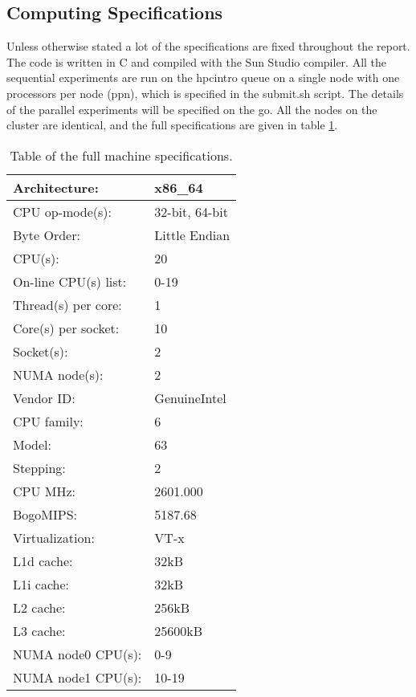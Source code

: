 \subsection{Computing Specifications}
Unless otherwise stated a lot of the specifications are fixed throughout the report. The code is written in C and compiled with the Sun Studio compiler. All the sequential experiments are run on the hpcintro queue on a single node with one processors per node (ppn), which is specified in the submit.sh script. The details of the parallel experiments will be specified on the go. All the nodes on the cluster are identical, and the full specifications are given in table \ref{tab:spec}.
\begin{table}[h!]
\centering
\begin{tabular}{l l}
Architecture:     &     x86\_64 \\ \hline
CPU op-mode(s):    &    32-bit, 64-bit\\ \hline
Byte Order:         &   Little Endian\\ \hline
CPU(s):             &   20\\ \hline
On-line CPU(s) list:&   0-19\\ \hline
Thread(s) per core: &   1\\ \hline
Core(s) per socket: &   10\\ \hline
Socket(s):          &   2\\ \hline
NUMA node(s):       &   2\\ \hline
Vendor ID:          &   GenuineIntel\\ \hline
CPU family:         &   6\\ \hline
Model:              &   63\\ \hline
Stepping:           &   2\\ \hline
CPU MHz:            &   2601.000\\ \hline
BogoMIPS:           &   5187.68\\ \hline
Virtualization:     &   VT-x\\ \hline
L1d cache:          &   32kB\\ \hline
L1i cache:          &   32kB\\ \hline
L2 cache:           &   256kB\\ \hline
L3 cache:           &   25600kB\\ \hline
NUMA node0 CPU(s):  &   0-9\\ \hline
NUMA node1 CPU(s):  &   10-19\\
\end{tabular}
\caption{Table of the full machine specifications.}
\label{tab:spec}
\end{table}
